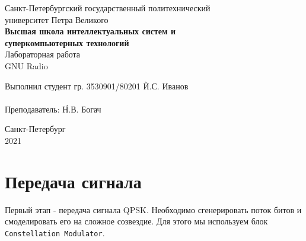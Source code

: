 \documentclass[a4paper, 14pt]{extarticle}
\begin{document}
    \begin{center}
        \begin{center}
            \hfill \break
            \normalsize{Санкт-Петербургский государственный политехнический}\\
            \normalsize{университет Петра Великого}\\
            \hfill \break
            \normalsize{\textbf{Высшая школа интеллектуальных систем и}}\\
            \normalsize{\textbf{суперкомпьютерных технологий}}\\
            \hfill \break
            \hfill \break
            \hfill \break
            \normalsize{Лабораторная работа}\\
            \hfill \break
            \normalsize{\LARGE GNU Radio}\\
        \end{center}
        \hfill \break
        \hfill \break
        \hfill \break
        \hfill \break
        \hfill \break
        \hfill \break
        \hfill \break
        \hfill \break
        \hfill \break
        \hfill \break
        \begin{tabbing}
            Выполнил студент гр. 3530901/80201 \`И.С. Иванов\\
            \\
            Преподаватель: \`Н.В. Богач\\
        \end{tabbing}
        \hfill \break
        \hfill \break
        \hfill \break
        \hfill \break
        \begin{center}
            Санкт-Петербург\\
            2021
        \end{center}
        \thispagestyle{empty}
    \end{center}

    \newpage
    \tableofcontents

    \newpage
    \listoffigures

    \newpage


    \section{Передача сигнала}
    \label{sec:1}

    Первый этап - передача сигнала QPSK.
    Необходимо сгенерировать поток битов и смоделировать его на сложное созвездие.
    Для этого мы используем блок \texttt{Constellation Modulator}.
\end{document}

